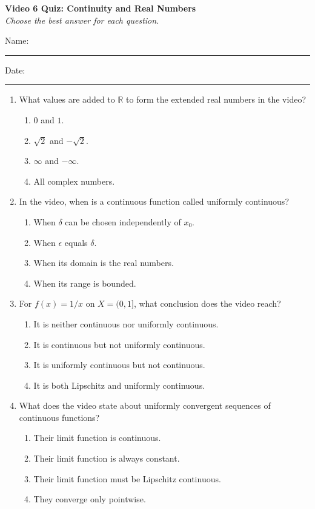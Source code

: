 \documentclass[10pt]{article}
\begin{document}
\begin{center}
  {\large\bfseries Video 6 Quiz: Continuity and Real Numbers}\\[0.25em]
  \textit{Choose the best answer for each question.}
\end{center}
\noindent Name:\ \rule{3.2in}{0.4pt}\hfill Date:\ \rule{1.25in}{0.4pt}
\vspace{0.7em}
\begin{enumerate}
  \item What values are added to $\mathbb{R}$ to form the extended real numbers in the video?
  \begin{enumerate}
    \item $0$ and $1$.
    \item $\sqrt{2}$ and $-\sqrt{2}$.
    \item $\infty$ and $-\infty$.
    \item All complex numbers.
  \end{enumerate}

  \item In the video, when is a continuous function called uniformly continuous?
  \begin{enumerate}
    \item When $\delta$ can be chosen independently of $x_0$.
    \item When $\epsilon$ equals $\delta$.
    \item When its domain is the real numbers.
    \item When its range is bounded.
  \end{enumerate}

  \item For $f(x)=1/x$ on $X=(0,1]$, what conclusion does the video reach?
  \begin{enumerate}
    \item It is neither continuous nor uniformly continuous.
    \item It is continuous but not uniformly continuous.
    \item It is uniformly continuous but not continuous.
    \item It is both Lipschitz and uniformly continuous.
  \end{enumerate}

  \item What does the video state about uniformly convergent sequences of continuous functions?
  \begin{enumerate}
    \item Their limit function is continuous.
    \item Their limit function is always constant.
    \item Their limit function must be Lipschitz continuous.
    \item They converge only pointwise.
  \end{enumerate}
\end{enumerate}
\end{document}
